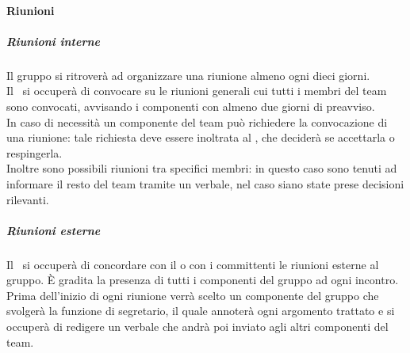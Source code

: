 	\paragraph{Riunioni}
		\subparagraph{Riunioni interne}
		Il gruppo si ritroverà ad organizzare una riunione almeno ogni dieci giorni. \\
		Il \RES \ si occuperà di convocare su  le riunioni generali cui tutti i membri del team sono convocati, avvisando i componenti con almeno due giorni di preavviso. \\
		In caso di necessità un componente del team può richiedere la convocazione di una riunione: tale richiesta deve essere inoltrata al \RES, che deciderà se accettarla o respingerla. \\
		Inoltre sono possibili riunioni tra specifici membri: in questo caso sono tenuti ad informare il resto del team tramite un verbale, nel caso siano state prese decisioni rilevanti. \\
		\subparagraph{Riunioni esterne}
		Il \RES  \ si occuperà di concordare con il  o con i committenti le riunioni esterne al gruppo. È gradita la presenza di tutti i componenti del gruppo ad ogni incontro. \\
		Prima dell'inizio di ogni riunione verrà scelto un componente del gruppo che svolgerà la funzione di segretario, il quale annoterà ogni argomento trattato e si occuperà di redigere un verbale che andrà poi inviato agli altri componenti del team.
